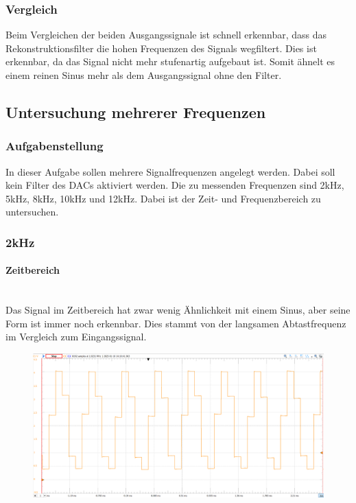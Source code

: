 \documentclass{article}
\begin{document}
\subsubsection{Vergleich}
Beim Vergleichen der beiden Ausgangssignale ist schnell erkennbar, dass das Rekonstruktionsfilter die hohen Frequenzen des Signals wegfiltert. Dies ist erkennbar, da das Signal nicht mehr stufenartig aufgebaut ist. Somit ähnelt es einem reinen Sinus mehr als dem Ausgangssignal ohne den Filter.
\newpage
\subsection{Untersuchung mehrerer Frequenzen}
\subsubsection{Aufgabenstellung}
In dieser Aufgabe sollen mehrere Signalfrequenzen angelegt werden. Dabei soll kein Filter des DACs aktiviert werden. Die zu messenden Frequenzen sind 2kHz, 5kHz, 8kHz, 10kHz und 12kHz. Dabei ist der Zeit- und Frequenzbereich zu untersuchen.

\subsubsection{2kHz}
\paragraph{Zeitbereich}\mbox{}\\
Das Signal im Zeitbereich hat zwar wenig Ähnlichkeit mit einem Sinus, aber seine Form ist immer noch erkennbar. Dies stammt von der langsamen Abtastfrequenz im Vergleich zum Eingangssignal.
\begin{figure}[h]
    \centering
    \includegraphics[width=0.75\linewidth]{img/Signal_04.png}
\end{figure}
\end{document}
